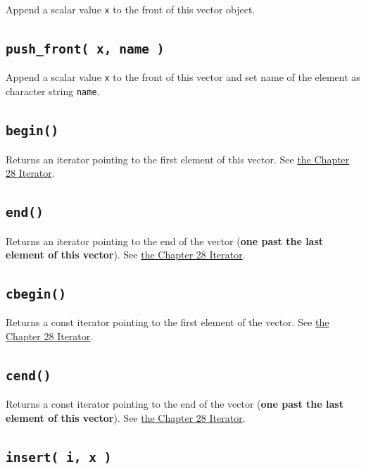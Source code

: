 \documentclass[
]{book}
\begin{document}
Append a scalar value \texttt{x} to the front of this vector object.

\hypertarget{push_front-x-name}{%
\subsection{\texorpdfstring{\texttt{push\_front(\ x,\ name\ )}}{push\_front( x, name )}}\label{push_front-x-name}}

Append a scalar value \texttt{x} to the front of this vector and set name of the element as character string \texttt{name}.

\hypertarget{begin}{%
\subsection{\texorpdfstring{\texttt{begin()}}{begin()}}\label{begin}}

Returns an iterator pointing to the first element of this vector. See \href{280_iterator.html}{the Chapter 28 Iterator}.

\hypertarget{end}{%
\subsection{\texorpdfstring{\texttt{end()}}{end()}}\label{end}}

Returns an iterator pointing to the end of the vector (\textbf{one past the last element of this vector}). See \href{280_iterator.html}{the Chapter 28 Iterator}.

\hypertarget{cbegin}{%
\subsection{\texorpdfstring{\texttt{cbegin()}}{cbegin()}}\label{cbegin}}

Returns a const iterator pointing to the first element of the vector. See \href{280_iterator.html}{the Chapter 28 Iterator}.

\hypertarget{cend}{%
\subsection{\texorpdfstring{\texttt{cend()}}{cend()}}\label{cend}}

Returns a const iterator pointing to the end of the vector (\textbf{one past the last element of this vector}). See \href{280_iterator.html}{the Chapter 28 Iterator}.

\hypertarget{insert-i-x}{%
\subsection{\texorpdfstring{\texttt{insert(\ i,\ x\ )}}{insert( i, x )}}\label{insert-i-x}}
\end{document}
